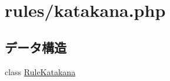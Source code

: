 \hypertarget{katakana_8php}{
\section{rules/katakana.php}
\label{katakana_8php}
}
\subsection*{データ構造}
\begin{DoxyCompactItemize}
\item 
class \hyperlink{class_rule_katakana}{\-Rule\-Katakana}
\end{DoxyCompactItemize}
